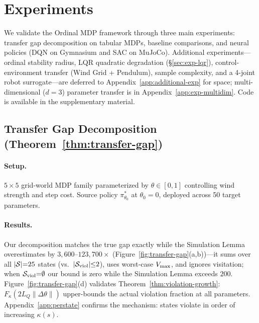 \section{Experiments}
\label{sec:experiments}

We validate the Ordinal MDP framework through three main experiments: transfer gap decomposition on tabular MDPs, baseline comparisons, and neural policies (DQN on Gymnasium and SAC on MuJoCo). Additional experiments---ordinal stability radius, LQR quadratic degradation (\S\ref{sec:exp-lqr}), control-environment transfer (Wind Grid + Pendulum), sample complexity, and a 4-joint robot surrogate---are deferred to Appendix~\ref{app:additional-exp} for space; multi-dimensional ($d=3$) parameter transfer is in Appendix~\ref{app:exp-multidim}. Code is available in the supplementary material.

\subsection{Transfer Gap Decomposition (Theorem~\ref{thm:transfer-gap})}
\label{sec:exp-transfer-gap}

\paragraph{Setup.} $5 \times 5$ grid-world MDP family parameterized by $\theta \in [0,1]$ controlling wind strength and step cost. Source policy $\pi^*_{\theta_0}$ at $\theta_0 = 0$, deployed across 50 target parameters.

\paragraph{Results.} Our decomposition matches the true gap exactly while the Simulation Lemma overestimates by $3{,}600$--$123{,}700\times$ (Figure~\ref{fig:transfer-gap}(a,b))---it sums over all $|\mathcal{S}|{=}25$ states (vs.\ $|\mathcal{S}_{\mathrm{viol}}|{\leq}2$), uses worst-case $V_{\max}$, and ignores visitation; when $\mathcal{S}_{\mathrm{viol}}{=}\emptyset$ our bound is zero while the Simulation Lemma exceeds $200$. Figure~\ref{fig:transfer-gap}(d) validates Theorem~\ref{thm:violation-growth}: $F_\kappa(2L_Q\|\Delta\theta\|)$ upper-bounds the actual violation fraction at all parameters. Appendix~\ref{app:perstate} confirms the mechanism: states violate in order of increasing $\kappa(s)$.

